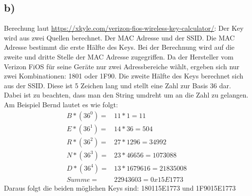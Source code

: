 \documentclass[10pt,a4paper]{article}
\begin{document}
\subsection{b)}
Berechung laut \href{https://xkyle.com/verizon-fios-wireless-key-calculator/}{https://xkyle.com/verizon-fios-wireless-key-calculator/}:
Der Key wird aus zwei Quellen berechnet. Der MAC Adresse und der SSID. Die MAC Adresse bestimmt die erste Hälfte des Keys. Bei der Berechnung wird auf die zweite und dritte Stelle der MAC Adresse zugegriffen. Da der Hersteller vom Verizon FiOS für seine Geräte nur zwei Adressbereiche wählt, ergeben sich nur zwei Kombinationen: 1801 oder 1F90. 
Die zweite Hälfte des Keys berechnet sich aus der SSID. Diese ist 5 Zeichen lang und stellt eine Zahl zur Basis 36 dar. Dabei ist zu beachten, dass man den String umdreht um an die Zahl zu gelangen.
Am Beispiel Bernd lautet es wie folgt:\\
\begin{align*}
B*(36^0) = &11 * 1 = 11\\
E*(36^1) = &14 * 36 = 504\\
R*(36^2) = &27 * 1296 = 34992\\
N*(36^3) = &23 * 46656 = 1073088\\
D*(36^4) = &13 * 1679616 = 21835008\\
Summe = &22943603 = 0x15E1773
\end{align*}
Daraus folgt die beiden möglichen Keys sind: 180115E1773 und 1F9015E1773
\end{document}
